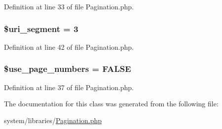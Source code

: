 Definition at line 33 of file Pagination.\-php.

\hypertarget{class_c_i___pagination_a79fd9718cc6c432f6919c28299584d77}{
\subsubsection[{\$uri\-\_\-segment}]{\setlength{\rightskip}{0pt plus 5cm}\$uri\-\_\-segment = 3}}\label{class_c_i___pagination_a79fd9718cc6c432f6919c28299584d77}


Definition at line 42 of file Pagination.\-php.

\hypertarget{class_c_i___pagination_ac19b7d290389a9188ca6466f85d14a85}{
\subsubsection[{\$use\-\_\-page\-\_\-numbers}]{\setlength{\rightskip}{0pt plus 5cm}\$use\-\_\-page\-\_\-numbers = F\-A\-L\-S\-E}}\label{class_c_i___pagination_ac19b7d290389a9188ca6466f85d14a85}


Definition at line 37 of file Pagination.\-php.



The documentation for this class was generated from the following file\-:\begin{DoxyCompactItemize}
\item 
system/libraries/\hyperlink{_pagination_8php}{Pagination.\-php}\end{DoxyCompactItemize}
